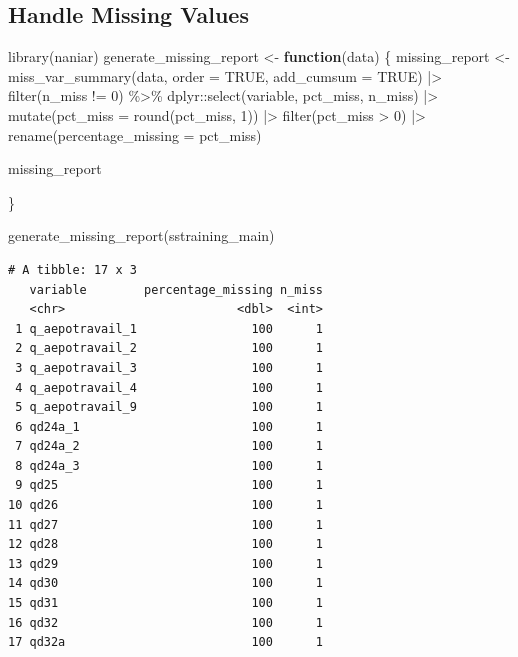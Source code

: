 \documentclass[
  letterpaper,
  DIV=11,
  numbers=noendperiod]{scrreprt}
\newenvironment{Shaded}{\begin{snugshade}}{\end{snugshade}}
\newcommand{\AttributeTok}[1]{\textcolor[rgb]{0.40,0.45,0.13}{#1}}
\newcommand{\ConstantTok}[1]{\textcolor[rgb]{0.56,0.35,0.01}{#1}}
\newcommand{\ControlFlowTok}[1]{\textcolor[rgb]{0.00,0.23,0.31}{\textbf{#1}}}
\newcommand{\DecValTok}[1]{\textcolor[rgb]{0.68,0.00,0.00}{#1}}
\newcommand{\FunctionTok}[1]{\textcolor[rgb]{0.28,0.35,0.67}{#1}}
\newcommand{\NormalTok}[1]{\textcolor[rgb]{0.00,0.23,0.31}{#1}}
\newcommand{\OtherTok}[1]{\textcolor[rgb]{0.00,0.23,0.31}{#1}}
\newcommand{\SpecialCharTok}[1]{\textcolor[rgb]{0.37,0.37,0.37}{#1}}
\begin{document}
\subsection{Handle Missing Values}\label{handle-missing-values}

\begin{Shaded}
\begin{Highlighting}[]
\FunctionTok{library}\NormalTok{(naniar) }
\NormalTok{generate\_missing\_report }\OtherTok{\textless{}{-}} \ControlFlowTok{function}\NormalTok{(data) \{}
\NormalTok{  missing\_report }\OtherTok{\textless{}{-}} \FunctionTok{miss\_var\_summary}\NormalTok{(data, }\AttributeTok{order =} \ConstantTok{TRUE}\NormalTok{,}
                                     \AttributeTok{add\_cumsum =} \ConstantTok{TRUE}\NormalTok{)  }\SpecialCharTok{|\textgreater{}} 
    \FunctionTok{filter}\NormalTok{(n\_miss }\SpecialCharTok{!=} \DecValTok{0}\NormalTok{) }\SpecialCharTok{\%\textgreater{}\%}
\NormalTok{    dplyr}\SpecialCharTok{::}\FunctionTok{select}\NormalTok{(variable, pct\_miss, n\_miss)  }\SpecialCharTok{|\textgreater{}} 
    \FunctionTok{mutate}\NormalTok{(}\AttributeTok{pct\_miss =} \FunctionTok{round}\NormalTok{(pct\_miss, }\DecValTok{1}\NormalTok{)) }\SpecialCharTok{|\textgreater{}} 
    \FunctionTok{filter}\NormalTok{(pct\_miss }\SpecialCharTok{\textgreater{}} \DecValTok{0}\NormalTok{) }\SpecialCharTok{|\textgreater{}} 
    \FunctionTok{rename}\NormalTok{(}\AttributeTok{percentage\_missing =}\NormalTok{ pct\_miss)}
  
\NormalTok{  missing\_report}
  
\NormalTok{\}}


\FunctionTok{generate\_missing\_report}\NormalTok{(sstraining\_main)}
\end{Highlighting}
\end{Shaded}

\begin{verbatim}
# A tibble: 17 x 3
   variable        percentage_missing n_miss
   <chr>                        <dbl>  <int>
 1 q_aepotravail_1                100      1
 2 q_aepotravail_2                100      1
 3 q_aepotravail_3                100      1
 4 q_aepotravail_4                100      1
 5 q_aepotravail_9                100      1
 6 qd24a_1                        100      1
 7 qd24a_2                        100      1
 8 qd24a_3                        100      1
 9 qd25                           100      1
10 qd26                           100      1
11 qd27                           100      1
12 qd28                           100      1
13 qd29                           100      1
14 qd30                           100      1
15 qd31                           100      1
16 qd32                           100      1
17 qd32a                          100      1
\end{verbatim}
\end{document}
